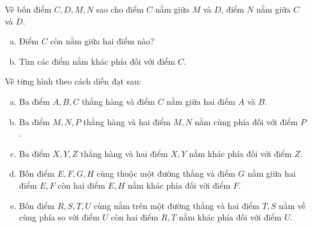\begin{bt}
\end{bt}   \begin{bt}
Vẽ bốn điểm $C, D, M, N$ sao cho điểm $C$ nằm giữa $M$ và $D$, điểm $N$ nằm giữa $C$ và $D$.
\begin{enumerate}[a)]
\item	Điểm $C$ còn nằm giữa hai điểm nào?
\item	Tìm các điểm nằm khác phía đối với điểm $C$.
\end{enumerate}
\end{bt}   \begin{bt}
Vẽ từng hình theo cách diễn đạt sau:
\begin{enumerate}[a)]
\item	Ba điểm $A, B, C$ thẳng hàng và điểm $C$ nằm giữa hai điểm $A$ và $B$.
\item	Ba điểm $M, N, P$ thẳng hàng và hai điểm $M, N$ nằm cùng phía đối với điểm $P$.
\item	Ba điểm $X, Y, Z$ thẳng hàng và hai điểm $X, Y$ nằm khác phía đối với điểm $Z$.
\item	Bốn điểm $E, F, G, H$ cùng thuộc một đường thẳng và điểm $G$ nằm giữa hai điểm $E, F$ còn hai điểm $E, H$ nằm khác phía đối với điểm $F$.
\item	Bốn điểm $R, S, T, U$ cùng nằm trên một đường thẳng và hai điểm $T, S$ nằm về cùng phía so với điểm $U$ còn hai điểm $R, T$ nằm khác phía đối với điểm $U$.
\end{enumerate}
\end{bt} 